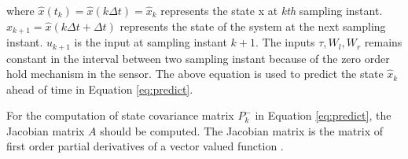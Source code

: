where $\hat{x}(t_k) = \hat{x}(k \Delta t) = \hat{x}_k$ represents the state x at \emph{kth} sampling instant. $\hat{x}_{k+1} = \hat{x}(k \Delta t + \Delta t)$ represents the state of the system at the next sampling instant. $u_{k+1}$ is the input at sampling instant $k+1$. The inputs $\tau, W_l, W_r$ remains constant in the interval between two sampling instant because of the zero order hold mechanism in the sensor. The above equation is used to predict the state $\hat{x}_k$ ahead of time in Equation \ref{eq:predict}. 

For the computation of state covariance matrix $P_k^-$ in Equation \ref{eq:predict}, the Jacobian matrix $A$ should be computed. The Jacobian matrix is the matrix of first order partial derivatives of a vector valued function \citep{wal76}.

